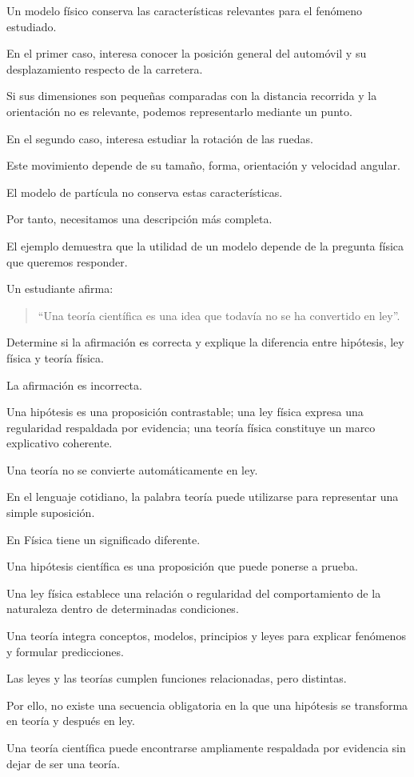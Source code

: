 \begin{explicacion}
Un modelo físico conserva las características relevantes para el fenómeno estudiado.

En el primer caso, interesa conocer la posición general del automóvil y su desplazamiento respecto de la carretera.

Si sus dimensiones son pequeñas comparadas con la distancia recorrida y la orientación no es relevante, podemos representarlo mediante un punto.

En el segundo caso, interesa estudiar la rotación de las ruedas.

Este movimiento depende de su tamaño, forma, orientación y velocidad angular.

El modelo de partícula no conserva estas características.

Por tanto, necesitamos una descripción más completa.

El ejemplo demuestra que la utilidad de un modelo depende de la pregunta física que queremos responder.
\end{explicacion}


\begin{ejercicio}
Un estudiante afirma:

\begin{quote}
``Una teoría científica es una idea que todavía no se ha convertido en ley''.
\end{quote}

Determine si la afirmación es correcta y explique la diferencia entre hipótesis, ley física y teoría física.
\end{ejercicio}

\begin{respuesta}
La afirmación es incorrecta.

Una hipótesis es una proposición contrastable; una ley física expresa una regularidad respaldada por evidencia; una teoría física constituye un marco explicativo coherente.

Una teoría no se convierte automáticamente en ley.
\end{respuesta}

\begin{explicacion}
En el lenguaje cotidiano, la palabra teoría puede utilizarse para representar una simple suposición.

En Física tiene un significado diferente.

Una hipótesis científica es una proposición que puede ponerse a prueba.

Una ley física establece una relación o regularidad del comportamiento de la naturaleza dentro de determinadas condiciones.

Una teoría integra conceptos, modelos, principios y leyes para explicar fenómenos y formular predicciones.

Las leyes y las teorías cumplen funciones relacionadas, pero distintas.

Por ello, no existe una secuencia obligatoria en la que una hipótesis se transforma en teoría y después en ley.

Una teoría científica puede encontrarse ampliamente respaldada por evidencia sin dejar de ser una teoría.
\end{explicacion}


